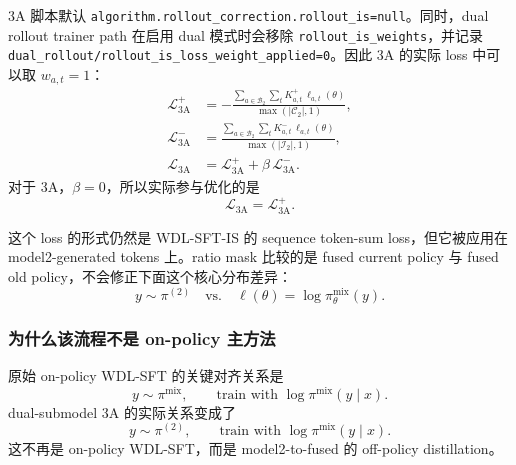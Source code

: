 3A 脚本默认 \texttt{algorithm.rollout\_correction.rollout\_is=null}。同时，dual rollout trainer path 在启用 dual 模式时会移除 \texttt{rollout\_is\_weights}，并记录 \texttt{dual\_rollout/rollout\_is\_loss\_weight\_applied=0}。因此 3A 的实际 loss 中可以取 $w_{a,t}=1$：
\begin{align}
    \mathcal{L}^{+}_{\mathrm{3A}}
        &=
        -\frac{
            \sum_{a\in\mathcal{B}_2}\sum_t
            K^+_{a,t}\,\ell_{a,t}(\theta)
        }{
            \max(|\mathcal{C}_2|,1)
        },\\
    \mathcal{L}^{-}_{\mathrm{3A}}
        &=
        \frac{
            \sum_{a\in\mathcal{B}_2}\sum_t
            K^-_{a,t}\,\ell_{a,t}(\theta)
        }{
            \max(|\mathcal{I}_2|,1)
        },\\
    \mathcal{L}_{\mathrm{3A}}
        &=
        \mathcal{L}^{+}_{\mathrm{3A}}
        +
        \beta\,\mathcal{L}^{-}_{\mathrm{3A}}.
\end{align}
对于 3A，$\beta=0$，所以实际参与优化的是
\begin{equation}
    \mathcal{L}_{\mathrm{3A}}
    =
    \mathcal{L}^{+}_{\mathrm{3A}}.
\end{equation}

这个 loss 的形式仍然是 WDL-SFT-IS 的 sequence token-sum loss，但它被应用在 model2-generated tokens 上。ratio mask 比较的是 fused current policy 与 fused old policy，不会修正下面这个核心分布差异：
\begin{equation}
    y\sim\pi^{(2)}
    \quad\text{vs.}\quad
    \ell(\theta)=\log\pi^{\mathrm{mix}}_{\theta}(y).
\end{equation}

\subsubsection{为什么该流程不是 on-policy 主方法}
\label{app:dual_rollout_not_on_policy}

原始 on-policy WDL-SFT 的关键对齐关系是
\begin{equation}
    y\sim\pi^{\mathrm{mix}},
    \qquad
    \text{train with } \log\pi^{\mathrm{mix}}(y\mid x).
\end{equation}
dual-submodel 3A 的实际关系变成了
\begin{equation}
    y\sim\pi^{(2)},
    \qquad
    \text{train with } \log\pi^{\mathrm{mix}}(y\mid x).
\end{equation}
这不再是 on-policy WDL-SFT，而是 model2-to-fused 的 off-policy distillation。

